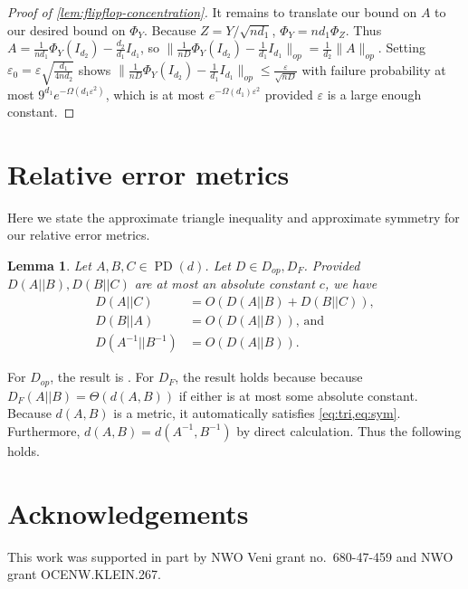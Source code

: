\documentclass[aos]{imsart}
\newtheorem{lemma}[theorem]{Lemma}
\theoremstyle{definition}
\numberwithin{equation}{section}
\DeclareMathOperator{\PD}{PD}
\newcommand{\eps}{\varepsilon}
\begin{document}
\begin{appendix}
\begin{proof}[Proof of \cref{lem:flipflop-concentration}]
It remains to translate our bound on $A$ to our desired bound on $\Phi_Y$. Because $Z = Y/\sqrt{nd_1}$, $\Phi_Y = n d_1 \Phi_Z$. Thus $A = \frac{1}{nd_1}\Phi_Y(I_{d_2}) - \frac{d_2}{d_1} I_{d_1}$, so $\|\frac{1}{nD}\Phi_Y(I_{d_2}) - \frac{1}{d_1} I_{d_1}\|_{op} = \frac{1}{d_2} \|A\|_{op}$. Setting $\eps_0 = \eps \sqrt{\frac{d_1}{4n d_2}}$ shows $\|\frac{1}{nD}\Phi_Y(I_{d_2}) - \frac{1}{d_1} I_{d_1}\|_{op} \leq \frac{\eps}{\sqrt{n D}}$ with failure probability at most $9^{d_1} e^{- \Omega(d_1 \eps^2)}$, which is at most $e^{ - \Omega(d_1) \eps^2}$ provided $\eps$ is a large enough constant.\end{proof}


\section{Relative error metrics}\label{sec:rel-error}
Here we state the approximate triangle inequality and approximate symmetry for our relative error metrics.
\begin{lemma}\label{lem:triangle-ineq}
Let $A, B, C \in \PD(d)$. Let $D \in D_{op}, D_F$. Provided $D(A||B), D(B||C)$ are at most an absolute constant $c$, we have
\begin{align}D(A||C) &= O(D(A||B) + D(B||C)),\label{eq:tri}\\
D(B||A) &= O(D(A||B))\label{eq:sym} \text{, and }\\
D(A^{-1}||B^{-1}) &= O(D(A||B)).
\end{align}
\end{lemma}
For $D_{op}$, the result is \cite[Lemma C.1]{FM20}. For $D_F$, the result holds because because $D_F(A|| B) = \Theta(d(A, B))$ if either is at most some absolute constant. Because $d(A, B)$ is a metric, it automatically satisfies \cref{eq:tri,eq:sym}. Furthermore, $d(A,B) = d(A^{-1}, B^{-1})$ by direct calculation. Thus the following holds.


\end{appendix}


\section*{Acknowledgements}
This work was supported in part by NWO Veni grant no.~680-47-459 and NWO grant OCENW.KLEIN.267.




\end{document}
